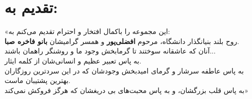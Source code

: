 \chapter*{\vspace{-2.38cm}\fontsize{15}{16}\selectfont تقدیم به:}
«این مجموعه را باکمال افتخار و احترام تقدیم می‌کنم به:\\
روح بلند بنیانگذار دانشگاه، مرحوم 
\textbf{افضلی‌پور}
 و همسر گرامیشان 
\textbf{ بانو فاخره صبا}.\\
آنان که عاشقانه سوختند تا گرمابخش وجود ما و روشنگر راهمان باشند...\\
به پاس تعبیر عظیم و انسانی‌شان از کلمه ایثار.\\
به پاس عاطفه سرشار و گرمای امیدبخش وجودشان که در این سردترین روزگاران بهترین پشتیبان ماست.\\
به پاس قلب بزرگشان، و به پاس محبت‌های بی دریغشان که هرگز فروکش نمی‌کند»








